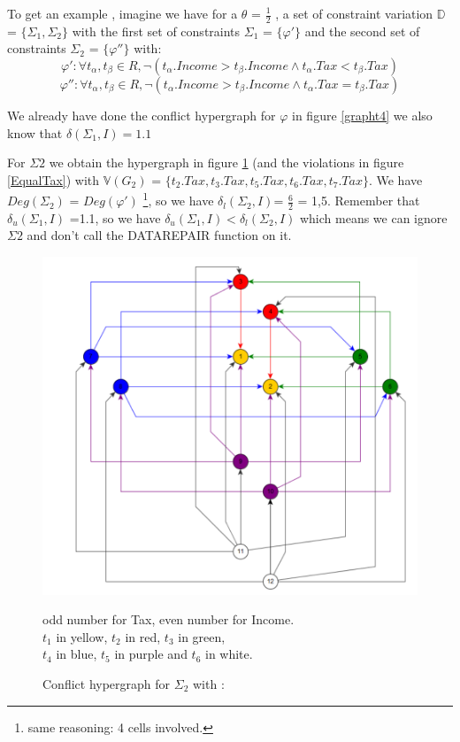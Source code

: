 \documentclass[letterpaper, 12pt]{report}
\begin{document}
To get an example , imagine we have for a $\theta$ = $\frac{1}{2}$ , a set of constraint variation $\mathbb{D}$ = $\{\Sigma_1,\Sigma_2\}$ with the first set of constraints $\Sigma_1$ = $\{\varphi'\}$ and the second set of constraints $\Sigma_2$ = $\{\varphi''\}$ with:
$$\varphi': \forall t_\alpha,t_\beta \in R , \neg(t_\alpha.Income > t_\beta.Income \wedge t_\alpha.Tax < t_\beta.Tax)$$
$$\varphi'': \forall t_\alpha,t_\beta \in R , \neg(t_\alpha.Income > t_\beta.Income \wedge t_\alpha.Tax = t_\beta.Tax)$$

We already have done the conflict hypergraph for $\varphi$ in figure \ref{grapht4} we also know that $\delta(\Sigma_1,I)=1.1$

For $\Sigma2$ we obtain the hypergraph in figure \ref{graphSigma2} (and the violations in figure \ref{EqualTax}) with $\mathbb{V}(G_2)$ = $\{ t_2.Tax,t_3.Tax,t_5.Tax,t_6.Tax,t_7.Tax\}$. We have $Deg(\Sigma_2)$ = $Deg(\varphi')$ \footnote{same reasoning: 4 cells involved.}, so we have $\delta_l(\Sigma_2,I)$= $\frac{6}{2}$ = 1,5. Remember that $\delta_u(\Sigma_1,I)$ =1.1, so we have $\delta_u(\Sigma_1,I) < \delta_l(\Sigma_2,I)$ which means we can ignore $\Sigma2$ and don't call the DATAREPAIR function on it.

\begin{figure}
\centering
\hspace*{-1.8cm} \includegraphics[scale=0.95]{img/graph2}
\caption{\label{graphSigma2}Conflict hypergraph for $\Sigma_2$ with :}
	odd number for Tax, even number for Income. \\
	$t_1$ in yellow, $t_2$ in red, $t_3$ in green,\\
	$t_4$ in blue, $t_5$ in purple and $t_6$ in white.
\end{figure}
\end{document}
